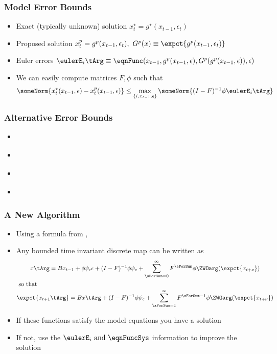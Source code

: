 \documentclass[notheorems]{beamer}
\begin{document}
\begin{frame}
  \frametitle{Model Error Bounds}
  \begin{itemize}
  \item Exact (typically unknown) solution $x^\star_t=g^\star(x_{t-1},\epsilon_t)$ 
  \item Proposed solution  $x^p_t=g^p(x_{t-1},\epsilon_t), \,\,G^p(x)\equiv \expct{g^p(x_{t-1},\epsilon_t)}$ 
 \item Euler errors $\eulerE_i\tArg \equiv  \eqnFunc(x_{t-1},g^p(x_{t-1},\epsilon),G^p(g^p(x_{t-1},\epsilon)),\epsilon)$
 \item We can easily compute matrices  $F, \phi $ such that 
 {\small   \begin{gather*}
 \someNorm{ x^\star_{t}(x_{t-1},\epsilon) -	 x^p_{t}(x_{t-1},\epsilon)} \le 
 \max_{\{i,x_{t-1},\epsilon\}} \someNorm{(I-F)^{-1} \phi \eulerE_i\tArg }
    \end{gather*}}
  \end{itemize}
\end{frame}
\begin{frame}
  \frametitle{Alternative Error Bounds}
  \begin{itemize}
  \item \cite{judd2017lower}
  \item \cite{peralta-alva14}
  \item \cite{santos2005accuracy}
  \item \cite{Santos2000accuracy}
  \end{itemize}
\end{frame}




\begin{frame}
  \frametitle{A New Algorithm}
 {\small  
\begin{itemize}
\item Using a formula from \citep{anderson10},
 \item Any bounded time invariant discrete map can be written as
    \begin{gather*}
      	 x\tArg =B x_{t-1}+ \phi \psi_\epsilon\epsilon + (I - F)^{-1} \phi \psi_c + \sum_{\sForSum=0}^\infty F^\sForSum \phi \ZWOarg(\expct{x_{t+\nu}})\\ \intertext{ so that}
\expct{ x_{t+1}\tArg} =B x\tArg  + (I - F)^{-1} \phi \psi_c+ \sum_{\sForSum =1}^\infty F^{\sForSum-1} \phi \ZWOarg(\expct{x_{t+\nu}}) 
    \end{gather*}
   \item If these functions satisfy the model equations you have a solution
   \item If not, use the $\eulerE_i \text{ and } \eqnFuncSys $ information to improve the solution
  \end{itemize}
}
\end{frame}
\end{document}
